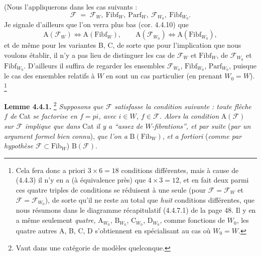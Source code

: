 \documentclass[11pt]{article}
\newcommand{\printedpage}[1]{\marginpar{\footnotesize p.~#1}}
\newcommand{\msp}[1]{\marginpar{\footnotesize [#1]}}
\newcommand{\cF}{\mathcal{F}}
\newcommand{\Fib}{\mathrm{Fib}}
\newcommand{\Fibf}{\mathrm{Fibf}}
\newcommand{\Parf}{\mathrm{Parf}}
\begin{document}
(Nous l'appliquerons dans les cas suivants : %
\[
\cF \;=\; \cF_W,\ \Fibf_W,\ \Parf_W,\ \cF_{W_0},\ \Fibf_{W_0}.
\tag*{(4.4.2)}
\]
Je signale d'ailleurs que l'on verra plus bas (cor. 4.4.10) que
\[
\mathrm{A}(\cF_W) \iff \mathrm{A}(\Fibf_W), \qquad \mathrm{A}(\cF_{W_0}) \iff \mathrm{A}(\Fibf_{W_0}),
\tag*{(4.4.3)}
\]
et de même pour les variantes B, C, de sorte que pour l'implication que nous voulons établir, il n'y a pas lieu de distinguer les cas de $\cF_W$ et $\Fibf_W$, de $\cF_{W_0}$ et $\Fibf_{W_0}$. D'ailleurs il suffira de regarder les ensembles $\cF_{W_0}$, $\Fibf_{W_0}$, $\Parf_{W_0}$, puisque le cas des ensembles relatifs à $W$ en sont un cas particulier (en prenant $W_0 = W$). \footnote[28]{Cela fera donc a priori $3 \times 6 = 18$ conditions différentes, mais à cause de (4.4.3) il n'y en a (à équivalence près) que $4 \times 3 = 12$, et en fait deux parmi ces quatre triples de conditions se réduisent à une seule (pour $\cF = \cF_W$ et $\cF = \cF_{W_0}$), de sorte qu'il ne reste au total que \textit{huit} conditions différentes, que nous résumons dans le diagramme récapitulatif (4.4.7.1) de la page 48. Il y en a même seulement \textit{quatre,} $\mathrm{A}_{W_0}$, $\mathrm{B}_{W_0}$, $\mathrm{C}_{W_0}$, $\mathrm{D}_{W_0}$, comme fonctions de $W_0$, les quatre autres A, B, C, D s'obtiennent en spécialisant au cas où $W_0 = W$.}

\printedpage{25}

\textbf{Lemme 4.4.1.} \footnote[29]{Vaut dans une catégorie de modèles quelconque.} \textit{Supposons que $\cF$ satisfasse la condition suivante : toute flèche $f$ de} Cat \textit{se factorise en $f = pi$, avec $i \in W$, $f \in \cF$. Alors la condition} $\mathrm{A}(\cF)$ \textit{sur $\cF$ implique que dans} Cat \textit{il y a “assez de $W$-fibrations”, et par suite} (\textit{par un argument formel bien} %
\msp{page 42}
\textit{connu}), \textit{que l'on a} $\mathrm{B}(\Fib_W)$, \textit{et a fortiori} (\textit{comme par hypothèse} $\cF \subset \Fib_W$) $\mathrm{B}(\cF)$.
\end{document}
